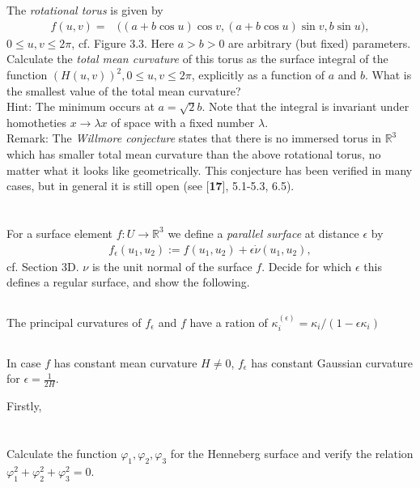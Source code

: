 \documentclass[12pt]{amsart}
\begin{document}
\newpage
\section{}The \textit{rotational torus} is given by
\begin{align*}
	f(u,v)=&\big((a+b\cos u)\cos v,(a+b\cos u)\sin v,b\sin u \big),
\end{align*}
$0\leq u,v\leq2\pi$, cf. Figure 3.3. Here $a>b>0$ are arbitrary (but fixed) parameters. Calculate the \textit{total mean curvature} of this torus as the surface integral of the function $(H(u,v))^2,0\leq u,v\leq2\pi$, explicitly as a function of $a$ and $b$. What is the smallest value of the total mean curvature?
\\Hint: The minimum occurs at $a=\sqrt2b$. Note that the integral is invariant under homotheties $x\to\lambda x$ of space with a fixed number $\lambda$.
\\Remark: The \textit{Willmore conjecture} states that there is no immersed torus in $\mathbb{R}^3$ which has smaller total mean curvature than the above rotational torus, no matter what it looks like geometrically. This conjecture has been verified in many cases, but in general it is still open (see [\textbf{17}], 5.1-5.3, 6.5).

\newpage
\section{}For a surface element $f:U\to\mathbb{R}^3$ we define a \textit{parallel surface} at distance $\epsilon$ by
\begin{align*}
	f_\epsilon(u_1,u_2):=f(u_1,u_2)+\epsilon\dot\nu(u_1,u_2),
\end{align*}
cf. Section 3D. $\nu$ is the unit normal of the surface $f$. Decide for which $\epsilon$ this defines a regular surface, and show the following.
\subsection{} The principal curvatures of $f_\epsilon$ and $f$ have a ration of $\kappa_i^{(\epsilon)}=\kappa_i/(1-\epsilon\kappa_i)$
\subsection{} In case $f$ has constant mean curvature $H\neq0$, $f_\epsilon$ has constant Gaussian curvature for $\epsilon=\frac{1}{2H}$.
\setcounter{subsection}{0}
\\
\par Firstly, 
\subsection{}

\newpage
\section{}Calculate the function $\varphi_1,\varphi_2,\varphi_3$ for the Henneberg surface and verify the relation $\varphi_1^2+\varphi_2^2+\varphi_3^2=0$.
\end{document}
